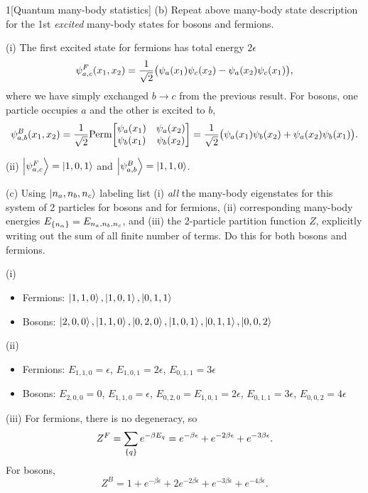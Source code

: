 \documentclass[12pt]{article}
\begin{document}
\begin{problem}{1}[Quantum many-body statistics]
(b) Repeat above many-body state description for the 1st \textit{excited}
many-body states for bosons and fermions.
\begin{solution}
(i) The first excited state for fermions has total energy $2\epsilon$
\begin{equation}
    \psi_{a,c}^F(x_1,x_2)=\frac1{\sqrt2}\qty(\psi_a(x_1)\psi_c(x_2)-\psi_a(x_2)\psi_c(x_1)),
\end{equation}
where we have simply exchanged $b\to c$ from the previous result. For bosons,
one particle occupies $a$ and the other is excited to $b$,
\begin{equation}
    \psi_{a,b}^B(x_1,x_2)=\frac1{\sqrt2}\t{Perm}\mqty[\psi_a(x_1)&\psi_a(x_2)\\\psi_b(x_1)&\psi_b(x_2)]=\frac1{\sqrt2}\qty(\psi_a(x_1)\psi_b(x_2)+\psi_a(x_2)\psi_b(x_1)).
\end{equation}

(ii) $\ket{\psi_{a,c}^F}=\ket{1,0,1}$ and $\ket{\psi_{a,b}^B}=\ket{1,1,0}$.
\end{solution}

(c) Using $\ket{n_a,n_b,n_c}$ labeling list (i) \textit{all} the many-body
eigenstates for this system of 2 particles for bosons and for fermions, (ii)
corresponding many-body energies $E_\qty{n_\alpha}=E_{n_a,n_b,n_c}$, and (iii)
the 2-particle partition function $Z$, explicitly writing out the sum of all
finite number of terms. Do this for both bosons and fermions.
\begin{solution}
(i) 
\begin{itemize}
    \item Fermions:  $\ket{1,1,0},\ket{1,0,1},\ket{0,1,1}$
    \item Bosons: $\ket{2,0,0},\ket{1,1,0},\ket{0,2,0},\ket{1,0,1},\ket{0,1,1},\ket{0,0,2}$
\end{itemize}

(ii)
\begin{itemize}
    \item Fermions: $E_{1,1,0}=\epsilon$, $E_{1,0,1}=2\epsilon$,
        $E_{0,1,1}=3\epsilon$ 
    \item Bosons: $E_{2,0,0}=0$, $E_{1,1,0}=\epsilon$,
        $E_{0,2,0}=E_{1,0,1}=2\epsilon$, $E_{0,1,1}=3\epsilon$,
        $E_{0,0,2}=4\epsilon$
\end{itemize}

(iii) For fermions, there is no degeneracy, so
\begin{equation}
    Z^F = \sum_{\qty{q}}e^{-\beta E_q}
    =e^{-\beta\epsilon}+e^{-2\beta\epsilon}+e^{-3\beta\epsilon}.
\end{equation}
For bosons,
\begin{equation}
    Z^B=1+e^{-\beta\epsilon}+2e^{-2\beta\epsilon}
    +e^{-3\beta\epsilon}+e^{-4\beta\epsilon}.
\end{equation}
\end{solution}


\end{problem}
\end{document}
